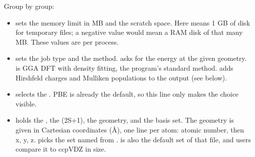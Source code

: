 \documentclass[letterpaper,10pt,english,openany,oneside]{sphinxmanual}
\begin{document}
\sphinxAtStartPar
Group by group:
\begin{itemize}
\item {} 
\sphinxAtStartPar
{\hyperref[\detokenize{reference/system:group-system}]{}} sets the memory limit in MB and the scratch space. Here  means 1 GB of disk
for temporary files; a negative value would mean a RAM disk of that many MB. These values are per process.



\item {} 
\sphinxAtStartPar
{\hyperref[\detokenize{reference/control:group-control}]{}} sets the job type and the method. {\hyperref[\detokenize{reference/control:control-task}]{}} asks for the
energy at the given geometry. {\hyperref[\detokenize{reference/control:control-theory}]{}} is GGA DFT with density fitting, the program’s
standard method.  adds Hirshfeld charges and Mulliken populations to the output (see
{\hyperref[\detokenize{start/getting-started:qs-charges}]{}} below).

\item {} 
\sphinxAtStartPar
{\hyperref[\detokenize{reference/dft:group-dft}]{}} selects the {\hyperref[\detokenize{reference/dft:dft-functional}]{}}. PBE is already the default, so this line
only makes the choice visible. 

\item {} 
\sphinxAtStartPar
{\hyperref[\detokenize{reference/molecule:group-molecule}]{}} holds the {\hyperref[\detokenize{reference/molecule:molecule-charge}]{}}, the
{\hyperref[\detokenize{reference/molecule:molecule-mult}]{}} (2S+1), the geometry, and the basis set. The geometry is given in Cartesian
coordinates (Å), one line per atom: atomic number, then x, y, z. {\hyperref[\detokenize{reference/molecule:molecule-set}]{}} picks the set named
 from .  is also the default set of that file, and users compare it to cc\sphinxhyphen{}pVDZ in size. 

\end{itemize}
\end{document}
